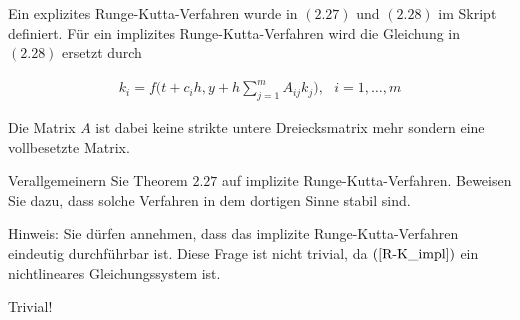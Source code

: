 \begin{exercise}
  Ein explizites Runge-Kutta-Verfahren wurde in $(2.27)$ und $(2.28)$ im Skript
  definiert. Für ein implizites Runge-Kutta-Verfahren wird die Gleichung in
  $(2.28)$ ersetzt durch

  \begin{align} \label{R-K_impl}
    k_i = f \Bigg( t + c_ih, y + h\sum_{j=1}^m A_{ij} k_j
    \Bigg),\text{ } i=1,\ldots, m
  \end{align}

  Die Matrix $A$ ist dabei keine strikte untere Dreiecksmatrix mehr sondern eine
  vollbesetzte Matrix.

  Verallgemeinern Sie Theorem $2.27$ auf implizite Runge-Kutta-Verfahren. Beweisen
  Sie dazu, dass solche Verfahren in dem dortigen Sinne stabil sind.

  Hinweis: Sie dürfen annehmen, dass das implizite Runge-Kutta-Verfahren eindeutig
  durchführbar ist. Diese Frage ist nicht trivial, da $(\ref{R-K_impl})$ ein
  nichtlineares Gleichungssystem ist.
\end{exercise}

\begin{solution}
  Trivial!
\end{solution}

